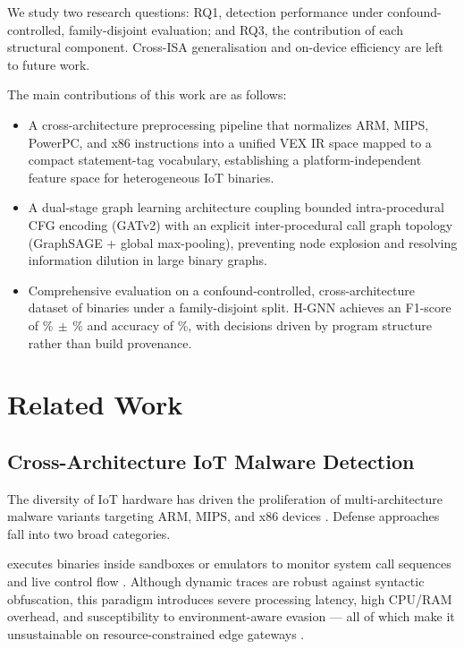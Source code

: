 \documentclass{llncs}
\begin{document}
We study two research questions: RQ1, detection performance under
confound-controlled, family-disjoint evaluation; and RQ3, the contribution
of each structural component. Cross-ISA generalisation and on-device
efficiency are left to future work.

The main contributions of this work are as follows:
\begin{itemize}
    \item {} A
    cross-architecture preprocessing pipeline that normalizes
    ARM, MIPS, PowerPC, and x86 instructions into a unified
    VEX IR space mapped to a compact statement-tag vocabulary, establishing
    a platform-independent feature space for heterogeneous IoT
    binaries.

    \item {}
    A dual-stage graph learning architecture coupling bounded
    intra-procedural CFG encoding (GATv2) with an explicit 
    inter-procedural call graph topology (GraphSAGE + global max-pooling),
    preventing node explosion and resolving information dilution
    in large binary graphs.

    \item {} Comprehensive
    evaluation on a confound-controlled, cross-architecture dataset of \dsTotal{} binaries under a family-disjoint split.
    H-GNN achieves an F1-score of \hgnnF\%$\,\pm\,$\hgnnFstd\% and accuracy of \hgnnAcc\%,
    with decisions driven by program structure rather than build provenance.
\end{itemize}


\section{Related Work}
\label{sec:related_work}

\subsection{Cross-Architecture IoT Malware Detection}

The diversity of IoT hardware has driven the proliferation of
multi-architecture malware variants targeting ARM, MIPS, and
x86 devices \cite{b1}. Defense approaches fall into two broad
categories.

 executes binaries inside sandboxes
or emulators to monitor system call sequences and live control
flow \cite{b3}. Although dynamic traces are robust against
syntactic obfuscation, this paradigm introduces severe
processing latency, high CPU/RAM overhead, and susceptibility
to environment-aware evasion — all of which make it
unsustainable on resource-constrained edge gateways \cite{b2}.
\end{document}

